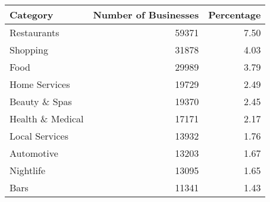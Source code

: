 \begin{tabular}{lrr}
\toprule
         Category &  Number of Businesses &  Percentage \\
\midrule
      Restaurants &                 59371 &        7.50 \\
         Shopping &                 31878 &        4.03 \\
             Food &                 29989 &        3.79 \\
    Home Services &                 19729 &        2.49 \\
    Beauty \& Spas &                 19370 &        2.45 \\
 Health \& Medical &                 17171 &        2.17 \\
   Local Services &                 13932 &        1.76 \\
       Automotive &                 13203 &        1.67 \\
        Nightlife &                 13095 &        1.65 \\
             Bars &                 11341 &        1.43 \\
\bottomrule
\end{tabular}
